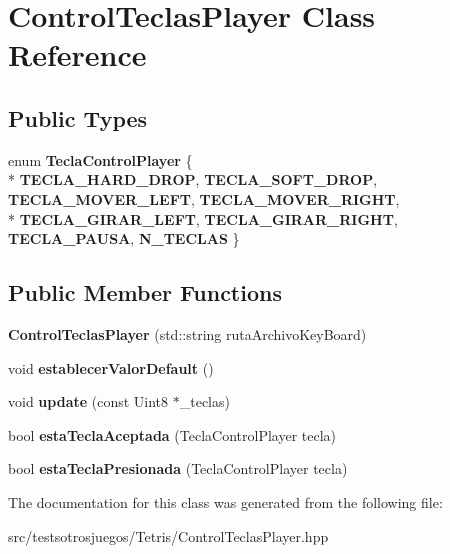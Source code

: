 \hypertarget{class_control_teclas_player}{}\section{Control\+Teclas\+Player Class Reference}
\label{class_control_teclas_player}
\subsection*{Public Types}
\begin{DoxyCompactItemize}
\item 
enum {\bfseries Tecla\+Control\+Player} \{ \\*
{\bfseries T\+E\+C\+L\+A\+\_\+\+H\+A\+R\+D\+\_\+\+D\+R\+OP}, 
{\bfseries T\+E\+C\+L\+A\+\_\+\+S\+O\+F\+T\+\_\+\+D\+R\+OP}, 
{\bfseries T\+E\+C\+L\+A\+\_\+\+M\+O\+V\+E\+R\+\_\+\+L\+E\+FT}, 
{\bfseries T\+E\+C\+L\+A\+\_\+\+M\+O\+V\+E\+R\+\_\+\+R\+I\+G\+HT}, 
\\*
{\bfseries T\+E\+C\+L\+A\+\_\+\+G\+I\+R\+A\+R\+\_\+\+L\+E\+FT}, 
{\bfseries T\+E\+C\+L\+A\+\_\+\+G\+I\+R\+A\+R\+\_\+\+R\+I\+G\+HT}, 
{\bfseries T\+E\+C\+L\+A\+\_\+\+P\+A\+U\+SA}, 
{\bfseries N\+\_\+\+T\+E\+C\+L\+AS}
 \}\hypertarget{class_control_teclas_player_aa264a2bfe49cae4380ce7f402a7b67cb}{}\label{class_control_teclas_player_aa264a2bfe49cae4380ce7f402a7b67cb}

\end{DoxyCompactItemize}
\subsection*{Public Member Functions}
\begin{DoxyCompactItemize}
\item 
{\bfseries Control\+Teclas\+Player} (std\+::string ruta\+Archivo\+Key\+Board)\hypertarget{class_control_teclas_player_aace524629cc9503e1cdb884da0f9c024}{}\label{class_control_teclas_player_aace524629cc9503e1cdb884da0f9c024}

\item 
void {\bfseries establecer\+Valor\+Default} ()\hypertarget{class_control_teclas_player_ae335e0af8196ab2c38b1d689c7f60892}{}\label{class_control_teclas_player_ae335e0af8196ab2c38b1d689c7f60892}

\item 
void {\bfseries update} (const Uint8 $\ast$\+\_\+teclas)\hypertarget{class_control_teclas_player_a6e18cbcf904086253e2bae1577f17b3b}{}\label{class_control_teclas_player_a6e18cbcf904086253e2bae1577f17b3b}

\item 
bool {\bfseries esta\+Tecla\+Aceptada} (Tecla\+Control\+Player tecla)\hypertarget{class_control_teclas_player_afeb71f0b1714db702bafdf2030d804df}{}\label{class_control_teclas_player_afeb71f0b1714db702bafdf2030d804df}

\item 
bool {\bfseries esta\+Tecla\+Presionada} (Tecla\+Control\+Player tecla)\hypertarget{class_control_teclas_player_aeff153841059f65c21fcd5e862a138b8}{}\label{class_control_teclas_player_aeff153841059f65c21fcd5e862a138b8}

\end{DoxyCompactItemize}


The documentation for this class was generated from the following file\+:\begin{DoxyCompactItemize}
\item 
src/testsotrosjuegos/\+Tetris/Control\+Teclas\+Player.\+hpp\end{DoxyCompactItemize}
